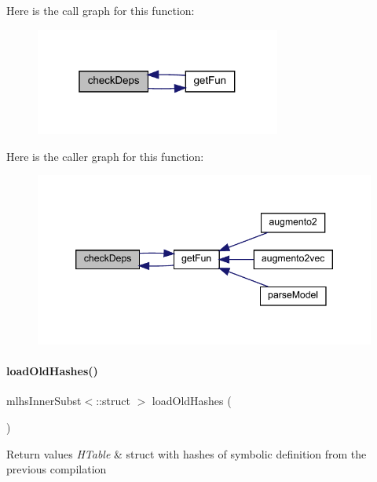 Here is the call graph for this function\+:
\nopagebreak
\begin{figure}[H]
\begin{center}
\leavevmode
\includegraphics[width=229pt]{classamimodel_ab566026e57f6cbce21a2a2c72b9f7f2b_cgraph}
\end{center}
\end{figure}
Here is the caller graph for this function\+:
\nopagebreak
\begin{figure}[H]
\begin{center}
\leavevmode
\includegraphics[width=346pt]{classamimodel_ab566026e57f6cbce21a2a2c72b9f7f2b_icgraph}
\end{center}
\end{figure}
\mbox{\label{classamimodel_a93346c96338624e417ee9732ffd96b28}} 
\paragraph{\texorpdfstring{load\+Old\+Hashes()}{loadOldHashes()}}
{\footnotesize\ttfamily mlhs\+Inner\+Subst$<$\+::struct $>$ load\+Old\+Hashes (\begin{DoxyParamCaption}{ }\end{DoxyParamCaption})}


\begin{DoxyRetVals}{Return values}
{\em H\+Table} & struct with hashes of symbolic definition from the previous compilation \\
\hline
\end{DoxyRetVals}


